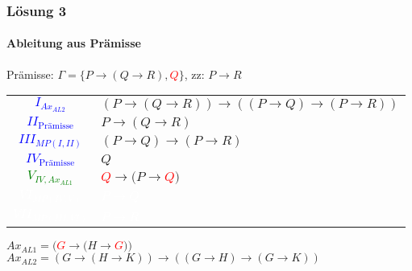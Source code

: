 \begin{frame}
	\frametitle{Lösung 3}
	\framesubtitle{Ableitung aus Prämisse}
	Prämisse: $\Gamma =\{P\rightarrow(Q\rightarrow R), $\textcolor{red}{$Q$}$\}$, zz: $P\rightarrow R$\\
	\begin{tabular}{cl}
		\textcolor{blue}{$I_{Ax_{AL2}}$}         & $(P\rightarrow(Q\rightarrow R))\rightarrow((P\rightarrow Q)\rightarrow(P\rightarrow R))$ \\
		\textcolor{blue}{$II_{\text{Prämisse}}$} & $P\rightarrow(Q\rightarrow R)$                                                           \\
		\textcolor{blue}{$III_{MP(I, II)}$}      & $(P\rightarrow Q)\rightarrow(P\rightarrow R)$                                            \\
		\textcolor{blue}{$IV_{\text{Prämisse}}$} & $Q$                                                                                      \\
		\textcolor{green}{$V_{IV, Ax_{AL1}}$}    & \textcolor{red}{$Q$}$\rightarrow(P\rightarrow $\textcolor{red}{$Q$}$)$                   \\
		\textcolor{white}{$VI_{MP(IV, V)}$}      & \textcolor{white}{$P\rightarrow Q$}                                                      \\
		\textcolor{white}{$VII_{MP(III, VI)}$}   & \textcolor{white}{$P\rightarrow R$}                                                      \\
	\end{tabular}
	$Ax_{AL1} = ($\textcolor{red}{$G$}$\rightarrow(H\rightarrow $\textcolor{red}{$G$}$))$\\
	$Ax_{AL2} = (G\rightarrow(H\rightarrow K))\rightarrow((G\rightarrow H)\rightarrow(G\rightarrow K))$\\
\end{frame}
